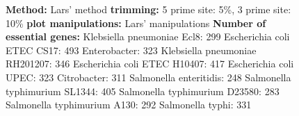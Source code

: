 \documentclass[a4paper,10pt]{article}
\begin{document}
\begin{figure}
{\textbf{Method:} Lars' method \newline
\textbf{trimming:} 5 prime site: 5\%, 3 prime site: 10\%\newline
\textbf{plot manipulations:} Lars' manipulations\newline
\textbf{Number of essential genes:}\newline
Klebsiella pneumoniae Ecl8: 299 \newline
Escherichia coli ETEC CS17: 493 \newline
Enterobacter: 323 \newline
Klebsiella pneumoniae RH201207: 346 \newline
Escherichia coli ETEC H10407: 417 \newline
Escherichia coli UPEC: 323 \newline
Citrobacter: 311 \newline
Salmonella enteritidis: 248 \newline
Salmonella typhimurium SL1344: 405 \newline
Salmonella typhimurium D23580: 283 \newline
Salmonella typhimurium A130: 292 \newline
Salmonella typhi: 331}
\end{figure}
\end{document}

